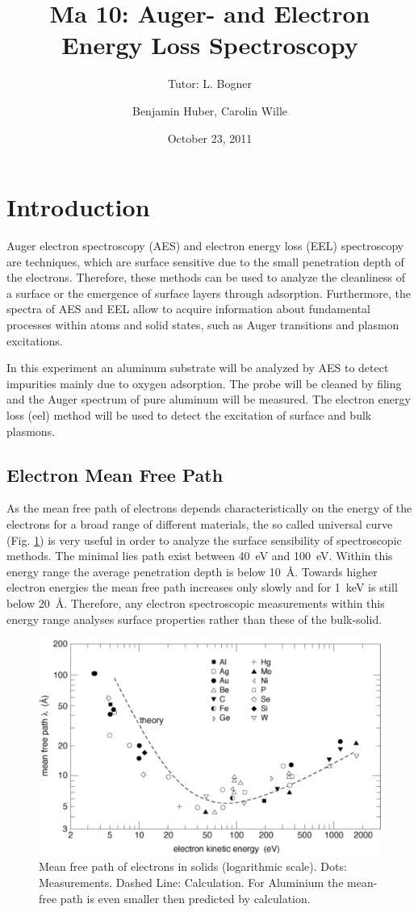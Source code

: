 \documentclass[a4paper]{scrartcl}
\title{Ma 10: Auger- and Electron Energy Loss Spectroscopy}
\subtitle{Tutor: L. Bogner}
\author{Benjamin Huber, Carolin Wille}
\date{October 23, 2011}
\numberwithin{equation}{section}
\numberwithin{figure}{section}
\numberwithin{table}{section}
\begin{document}
\thispagestyle{empty}
\maketitle
\tableofcontents
\clearpage



\section{Introduction}
Auger electron spectroscopy (AES) and electron energy loss (EEL) spectroscopy are techniques, which are surface sensitive due to the small penetration depth of the electrons. Therefore, these methods can be used to analyze the cleanliness of a surface or the emergence of surface layers through adsorption. Furthermore, the spectra of AES and EEL allow to acquire information about fundamental processes within atoms and solid states, such as Auger transitions and plasmon excitations.  

In this experiment an aluminum substrate will be analyzed by AES to detect impurities mainly due to oxygen adsorption. The probe will be cleaned by filing and the Auger spectrum of pure aluminum will be measured. The electron energy loss (eel) method will be used to detect the excitation of surface and bulk plasmons.


\subsection{Electron Mean Free Path}
As the mean free path of electrons depends characteristically on the energy of the electrons for a broad range of different materials, the so called universal curve (Fig. \ref{mf}) is very useful in order to analyze the surface sensibility of spectroscopic methods. The minimal lies path exist between \SI{40}{eV} and \SI{100}{eV}. Within this energy range the average penetration depth is below \SI{10}{\AA}. Towards higher electron energies the mean free path increases only slowly and for \SI{1}{keV} is still below \SI{20}{\AA}. Therefore, any electron spectroscopic measurements within this energy range analyses surface properties rather than these of the bulk-solid. 
\begin{figure}[htbp]
\centering
\includegraphics[width=0.5 \textwidth]{meanfree.pdf}
\caption{\small Mean free path of electrons in solids (logarithmic scale). Dots: Measurements. Dashed Line: Calculation. For Aluminium the mean-free path is even smaller then predicted by calculation. \cite{zangwill} }
\label{mf}
\end{figure}
\end{document}
